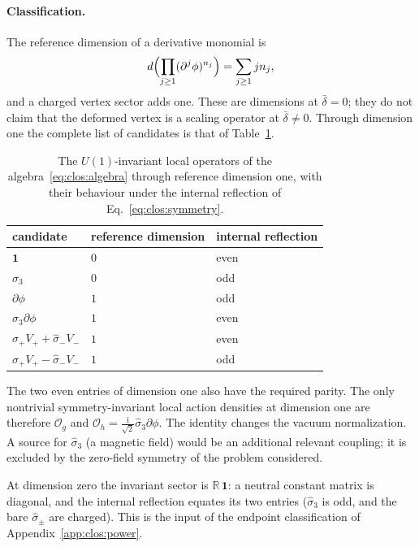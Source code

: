 \documentclass[11pt,a4paper]{article}
\numberwithin{equation}{section}
\newcommand{\db}{\bar\delta}
\newcommand{\Og}{\mathcal O_g}
\newcommand{\Oh}{\mathcal O_h}
\begin{document}
\paragraph{Classification.} The reference dimension of a derivative monomial is
\begin{equation}
 d\Bigl(\prod_{j\ge1}(\partial^j\phi)^{n_j}\Bigr)=\sum_{j\ge1}jn_j,
\end{equation}
and a charged vertex sector adds one. These are dimensions at $\db=0$; they do not claim that the deformed vertex is a
scaling operator at $\db\ne0$. Through dimension one the complete list of candidates is that of
Table~\ref{tab:clos:operators}.
\begin{table}[htbp]\centering\small
\renewcommand{\arraystretch}{1.15}
\begin{tabular}{@{}lll@{}}
\toprule
candidate & reference dimension & internal reflection\\
\midrule
$\mathbf 1$ & $0$ & even\\
$\hat\sigma_3$ & $0$ & odd\\
$\partial\phi$ & $1$ & odd\\
$\hat\sigma_3\partial\phi$ & $1$ & even\\
$\hat\sigma_+V_++\hat\sigma_-V_-$ & $1$ & even\\
$\hat\sigma_+V_+-\hat\sigma_-V_-$ & $1$ & odd\\
\bottomrule
\end{tabular}
\caption{The $U(1)$-invariant local operators of the algebra~\eqref{eq:clos:algebra} through reference dimension one,
with their behaviour under the internal reflection of Eq.~\eqref{eq:clos:symmetry}.}
\label{tab:clos:operators}
\end{table}
The two even entries of dimension one also have the required parity. The only nontrivial symmetry-invariant local
action densities at dimension one are therefore $\Og$ and $\Oh=\frac{\mathrm i}{\sqrt2}\hat\sigma_3\partial\phi$. The
identity changes the vacuum normalization. A source for $\hat\sigma_3$ (a magnetic field) would be an additional
relevant coupling; it is excluded by the zero-field symmetry of the problem considered.

At dimension zero the invariant sector is $\mathbb R\,\mathbf 1$: a neutral constant matrix is diagonal, and the
internal reflection equates its two entries ($\hat\sigma_3$ is odd, and the bare $\hat\sigma_\pm$ are charged). This
is the input of the endpoint classification of Appendix~\ref{app:clos:power}.
\end{document}
